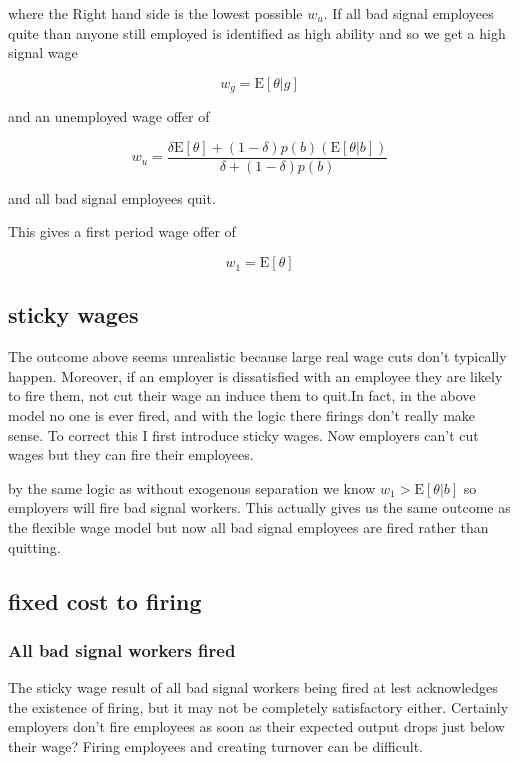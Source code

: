 \documentclass[11pt]{article}
\newcommand{\E}{\mathrm{E}}
\begin{document}
where the Right hand side is the lowest possible $w_u$. If all bad signal employees quite than anyone still employed is identified as high ability and so we get a high signal wage 

$$ w_g = \E[\theta|g]$$

and an unemployed wage offer of  

$$ w_u =  \frac{ \delta \E[\theta] + (1-\delta)p(b)( \E[\theta | b])}{\delta + (1-\delta)p(b)}$$

and all bad signal employees quit. 

This gives a first period wage offer of 

$$w_1 = \E[\theta]$$



\subsection{sticky wages}

The outcome above seems unrealistic because large real wage cuts don't typically happen. Moreover, if an employer is dissatisfied with an employee they are likely to fire them, not cut their wage an induce them to quit.In fact, in the above model no one is ever fired, and with the logic there firings don't really make sense. To correct this I first introduce sticky wages. Now employers can't cut wages but they can fire their employees.\par 

by the same logic as without exogenous separation we know $w_1 > \E[\theta | b]$ so employers will fire bad signal workers. This actually gives us the same outcome as the flexible wage model but now all bad signal employees are fired rather than quitting. 

\subsection{fixed cost to firing}

\subsubsection{All bad signal workers fired}

The sticky wage result of all bad signal workers being fired at lest acknowledges the existence of firing, but it may not be completely satisfactory either. Certainly employers don't fire employees as soon as their expected output drops just below their wage? Firing employees and creating turnover can be difficult. \par 
\end{document}
